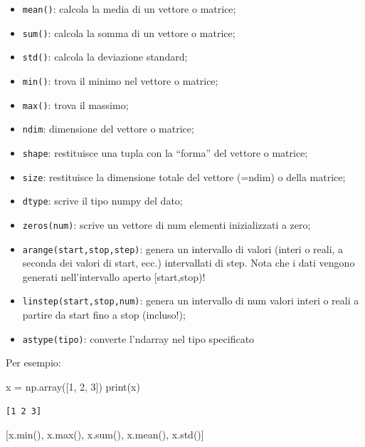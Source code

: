 \documentclass[
  letterpaper,
  krantz2]{{[}./krantz{]}}
\newenvironment{Shaded}{\begin{snugshade}}{\end{snugshade}}
\newcommand{\BuiltInTok}[1]{\textcolor[rgb]{0.00,0.23,0.31}{#1}}
\newcommand{\DecValTok}[1]{\textcolor[rgb]{0.68,0.00,0.00}{#1}}
\newcommand{\NormalTok}[1]{\textcolor[rgb]{0.00,0.23,0.31}{#1}}
\newcommand{\OperatorTok}[1]{\textcolor[rgb]{0.37,0.37,0.37}{#1}}
\providecommand{\tightlist}{%
  \setlength{\itemsep}{0pt}\setlength{\parskip}{0pt}}\usepackage{longtable,booktabs,array}
\begin{document}
\begin{itemize}
\tightlist
\item
  \texttt{mean()}: calcola la media di un vettore o matrice;
\item
  \texttt{sum()}: calcola la somma di un vettore o matrice;
\item
  \texttt{std()}: calcola la deviazione standard;
\item
  \texttt{min()}: trova il minimo nel vettore o matrice;
\item
  \texttt{max()}: trova il massimo;
\item
  \texttt{ndim}: dimensione del vettore o matrice;
\item
  \texttt{shape}: restituisce una tupla con la ``forma'' del vettore o
  matrice;
\item
  \texttt{size}: restituisce la dimensione totale del vettore (=ndim) o
  della matrice;
\item
  \texttt{dtype}: scrive il tipo numpy del dato;
\item
  \texttt{zeros(num)}: scrive un vettore di num elementi inizializzati a
  zero;
\item
  \texttt{arange(start,stop,step)}: genera un intervallo di valori
  (interi o reali, a seconda dei valori di start, ecc.) intervallati di
  step. Nota che i dati vengono generati nell'intervallo aperto
  {[}start,stop)!
\item
  \texttt{linstep(start,stop,num)}: genera un intervallo di num valori
  interi o reali a partire da start fino a stop (incluso!);
\item
  \texttt{astype(tipo)}: converte l'ndarray nel tipo specificato
\end{itemize}

Per esempio:

\begin{Shaded}
\begin{Highlighting}[]
\NormalTok{x }\OperatorTok{=}\NormalTok{ np.array([}\DecValTok{1}\NormalTok{, }\DecValTok{2}\NormalTok{, }\DecValTok{3}\NormalTok{])}
\BuiltInTok{print}\NormalTok{(x)}
\end{Highlighting}
\end{Shaded}

\begin{verbatim}
[1 2 3]
\end{verbatim}

\begin{Shaded}
\begin{Highlighting}[]
\NormalTok{[x.}\BuiltInTok{min}\NormalTok{(), x.}\BuiltInTok{max}\NormalTok{(), x.}\BuiltInTok{sum}\NormalTok{(), x.mean(), x.std()]}
\end{Highlighting}
\end{Shaded}
\end{document}
